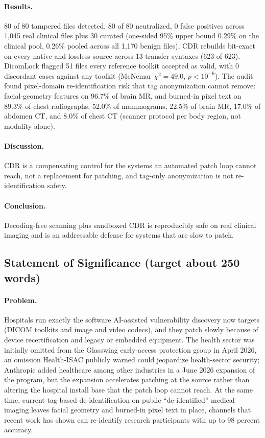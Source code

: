 \documentclass[11pt]{article}
\begin{document}
\paragraph{Results.} 80 of 80 tampered files detected, 80 of 80 neutralized, 0 false positives across 1,045 real clinical files plus 30 curated (one-sided 95\% upper bound 0.29\% on the clinical pool, 0.26\% pooled across all 1,170 benign files), CDR rebuilds bit-exact on every native and lossless source across 13 transfer syntaxes (623 of 623). DicomLock flagged 51 files every reference toolkit accepted as valid, with 0 discordant cases against any toolkit (McNemar $\chi^2 = 49.0$, $p < 10^{-6}$). The audit found pixel-domain re-identification risk that tag anonymization cannot remove: facial-geometry features on 96.7\% of brain MR, and burned-in pixel text on 89.3\% of chest radiographs, 52.0\% of mammograms, 22.5\% of brain MR, 17.0\% of abdomen CT, and 8.0\% of chest CT (scanner protocol per body region, not modality alone).

\paragraph{Discussion.} CDR is a compensating control for the systems an automated patch loop cannot reach, not a replacement for patching, and tag-only anonymization is not re-identification safety.

\paragraph{Conclusion.} Decoding-free scanning plus sandboxed CDR is reproducibly safe on real clinical imaging and is an addressable defense for systems that are slow to patch.

\subsection{Statement of Significance (target about 250 words)}

\paragraph{Problem.} Hospitals run exactly the software AI-assisted vulnerability discovery now targets (DICOM toolkits and image and video codecs), and they patch slowly because of device recertification and legacy or embedded equipment. The health sector was initially omitted from the Glasswing early-access protection group in April 2026, an omission Health-ISAC publicly warned could jeopardize health-sector security; Anthropic added healthcare among other industries in a June 2026 expansion of the program, but the expansion accelerates patching at the source rather than altering the hospital install base that the patch loop cannot reach. At the same time, current tag-based de-identification on public ``de-identified'' medical imaging leaves facial geometry and burned-in pixel text in place, channels that recent work has shown can re-identify research participants with up to 98 percent accuracy.
\end{document}
